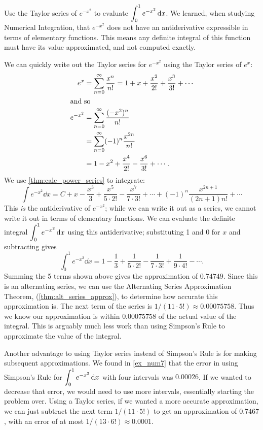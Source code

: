 \begin{example}\label{ex_ts7}%
Use the Taylor series of $e^{-x^2}$ to evaluate $\displaystyle \int_0^1e^{-x^2}\operatorname{d}\! x$.
\solution
We learned, when studying Numerical Integration, that $e^{-x^2}$ does not have an antiderivative expressible in terms of elementary functions. This means any definite integral of this function must have its value approximated, and not computed exactly.

We can quickly write out the Taylor series for $e^{-x^2}$ using the Taylor series of $e^x$:\vspace{-.5\baselineskip}
\begin{align*}
e^x &= \sum_{n=0}^\infty \frac{x^n}{n!} = 1+x+\frac{x^2}{2!}+\frac{x^3}{3!}+\dotsb\\
\intertext{and so}
e^{-x^2} &= \sum_{n=0}^\infty \frac{(-x^2)^n}{n!} \\
				&= \sum_{n=0}^\infty (-1)^n\frac{x^{2n}}{n!}\\
				&= 1-x^2+\frac{x^4}{2!}-\frac{x^6}{3!}+\dotsb.
\end{align*}
We use \autoref{thm:calc_power_series} to integrate:
\[\int e^{-x^2}\dd x = C + x - \frac{x^3}{3}+\frac{x^5}{5\cdot2!}-\frac{x^7}{7\cdot3!}+\dotsb +(-1)^n\frac{x^{2n+1}}{(2n+1)n!}+\dotsb\]
This \emph{is} the antiderivative of $e^{-x^2}$; while we can write it out as a series, we cannot write it out in terms of elementary functions. We can evaluate the definite integral $\displaystyle \int_0^1e^{-x^2}\operatorname{d}\! x$ using this antiderivative; substituting 1 and 0 for $x$ and subtracting gives
\[\int_0^1e^{-x^2}\dd x = 1-\frac{1}{3}+\frac{1}{5\cdot 2!}-\frac{1}{7\cdot3!} + \frac{1}{9\cdot4!}-\dotsb.\]
Summing the 5 terms shown above gives the approximation of $0.74749.$ Since this is an alternating series, we can use the Alternating Series Approximation Theorem, (\autoref{thm:alt_series_approx}), to determine how accurate this approximation is. The next term of the series is $ 1/(11\cdot5!) \approx 0.00075758$. Thus we know our approximation is within $0.00075758$ of the actual value of the integral. This is arguably much less work than using Simpson's Rule to approximate the value of the integral.
\end{example}

Another advantage to using Taylor series instead of Simpson's Rule is for making subsequent approximations.  We found in \autoref{ex_num7} that the error in using Simpson's Rule for $\displaystyle\int_0^1 e^{-x^2}\operatorname{d}\! x$ with four intervals was $0.00026$.  If we wanted to decrease that error, we would need to use more intervals, essentially starting the problem over.  Using a Taylor series, if we wanted a more accurate approximation, we can just subtract the next term $1/(11\cdot5!)$ to get an approximation of $0.7467$, with an error of at most $1/(13\cdot6!)\approx0.0001$.\bigskip

